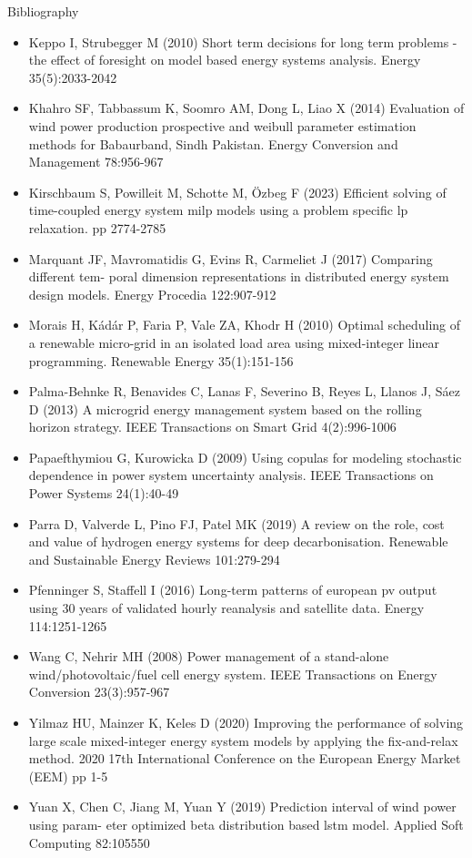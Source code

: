   \begin{frame}{Bibliography}
    \tiny
    \begin{itemize}
      \item Keppo I, Strubegger M (2010) Short term decisions for long term problems - the effect of
      foresight on model based energy systems analysis. Energy 35(5):2033-2042
      \item Khahro SF, Tabbassum K, Soomro AM, Dong L, Liao X (2014) Evaluation of wind power
      production prospective and weibull parameter estimation methods for Babaurband,
      Sindh Pakistan. Energy Conversion and Management 78:956-967
      \item Kirschbaum S, Powilleit M, Schotte M, \"{O}zbeg F (2023) Efficient solving of time-coupled
      energy system milp models using a problem specific lp relaxation. pp 2774-2785
      \item Marquant JF, Mavromatidis G, Evins R, Carmeliet J (2017) Comparing different tem-
      poral dimension representations in distributed energy system design models. Energy
      Procedia 122:907-912
      \item Morais H, K\'{a}d\'{a}r P, Faria P, Vale ZA, Khodr H (2010) Optimal scheduling of a renewable
      micro-grid in an isolated load area using mixed-integer linear programming. Renewable
      Energy 35(1):151-156
      \item Palma-Behnke R, Benavides C, Lanas F, Severino B, Reyes L, Llanos J, S\'{a}ez D (2013)
      A microgrid energy management system based on the rolling horizon strategy. IEEE
      Transactions on Smart Grid 4(2):996-1006
      \item Papaefthymiou G, Kurowicka D (2009) Using copulas for modeling stochastic dependence in
      power system uncertainty analysis. IEEE Transactions on Power Systems 24(1):40-49
      \item Parra D, Valverde L, Pino FJ, Patel MK (2019) A review on the role, cost and value of
      hydrogen energy systems for deep decarbonisation. Renewable and Sustainable Energy
      Reviews 101:279-294
      \item Pfenninger S, Staffell I (2016) Long-term patterns of european pv output using 30 years
      of validated hourly reanalysis and satellite data. Energy 114:1251-1265
      \item Wang C, Nehrir MH (2008) Power management of a stand-alone wind/photovoltaic/fuel cell
      energy system. IEEE Transactions on Energy Conversion 23(3):957-967
      \item Yilmaz HU, Mainzer K, Keles D (2020) Improving the performance of solving large scale
      mixed-integer energy system models by applying the fix-and-relax method. 2020 17th
      International Conference on the European Energy Market (EEM) pp 1-5
      \item Yuan X, Chen C, Jiang M, Yuan Y (2019) Prediction interval of wind power using param-
      eter optimized beta distribution based lstm model. Applied Soft Computing 82:105550
    \end{itemize}
  \end{frame}


